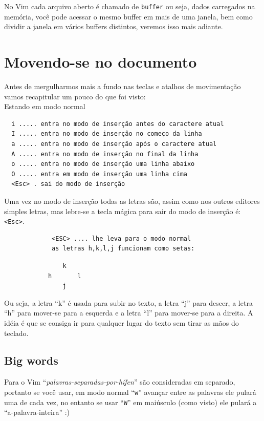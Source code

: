 \documentclass[10pt,a4paper,openany]{book}
\begin{document}
No Vim cada arquivo aberto é chamado de \verb|buffer| ou seja, dados
carregados na memória, você pode acessar o mesmo buffer em mais de uma
janela, bem como dividir a janela em vários buffers distintos, veremos
isso mais adiante.

\chapter{Movendo-se no documento}\label{cha:Movendo-se no documento}

Antes de mergulharmos mais a fundo nas teclas e atalhos de
movimentação vamos recapitular um pouco do que foi visto: \\



Estando em modo normal

\begin{verbatim}
  i ..... entra no modo de inserção antes do caractere atual
  I ..... entra no modo de inserção no começo da linha
  a ..... entra no modo de inserção após o caractere atual
  A ..... entra no modo de inserção no final da linha
  o ..... entra no modo de inserção uma linha abaixo
  O ..... entra em modo de inserção uma linha cima
  <Esc> . sai do modo de inserção
\end{verbatim}

Uma vez no modo de inserção todas as letras são, assim como nos outros
editores simples letras, mas lebre-se a tecla mágica para sair do modo
de inserção é: \verb+<Esc>+.

\begin{verbatim}
			 <ESC> .... lhe leva para o modo normal
			 as letras h,k,l,j funcionam como setas:
\end{verbatim}

\begin{verbatim}
				k
			h		l
				j
\end{verbatim}

Ou seja, a letra ``k'' é usada para subir no texto, a letra ``j'' para
descer, a letra ``h'' para mover-se para a esquerda e a letra ``l''
para mover-se para a direita. A idéia é que se consiga ir para
qualquer lugar do texto sem tirar as mãos do teclado.



\section{Big words}
\label{Big word's}

Para o Vim ``{\em{palavras-separadas-por-hífen}}'' são consideradas em separado, portanto se você usar,
em modo normal ``\verb+w+'' avançar entre as palavras ele pulará uma de
cada vez, no entanto se usar ``\verb+W+''
em maiúsculo (como visto) ele pulará a ``a-palavra-inteira'' :)
\end{document}
